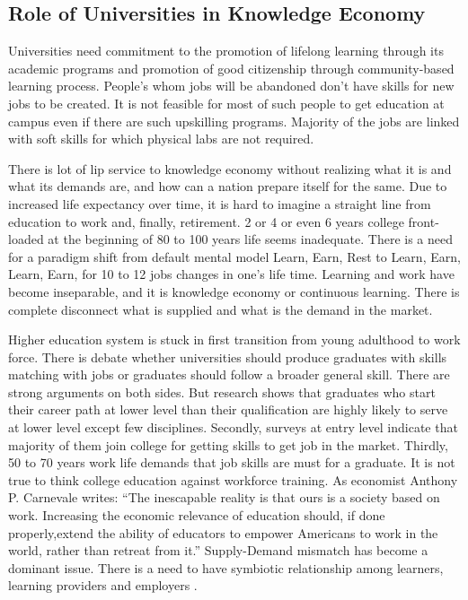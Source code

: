 \documentclass[
]{aft}
\begin{document}
\hypertarget{role-of-universities-in-knowledge-economy}{%
\subsection{Role of Universities in Knowledge
Economy}\label{role-of-universities-in-knowledge-economy}}

Universities need commitment to the promotion of lifelong learning
through its academic programs and promotion of good citizenship through
community-based learning process. People's whom jobs will be abandoned
don't have skills for new jobs to be created. It is not feasible for
most of such people to get education at campus even if there are such
upskilling programs. Majority of the jobs are linked with soft skills
for which physical labs are not required.

There is lot of lip service to knowledge economy without realizing what
it is and what its demands are, and how can a nation prepare itself for
the same. Due to increased life expectancy over time, it is hard to
imagine a straight line from education to work and, finally, retirement.
2 or 4 or even 6 years college front-loaded at the beginning of 80 to
100 years life seems inadequate. There is a need for a paradigm shift
from default mental model Learn, Earn, Rest to Learn, Earn, Learn, Earn,
for 10 to 12 jobs changes in one's life time. Learning and work have
become inseparable, and it is knowledge economy or continuous learning.
There is complete disconnect what is supplied and what is the demand in
the market.

Higher education system is stuck in first transition from young
adulthood to work force. There is debate whether universities should
produce graduates with skills matching with jobs or graduates should
follow a broader general skill. There are strong arguments on both
sides. But research shows that graduates who start their career path at
lower level than their qualification are highly likely to serve at lower
level except few disciplines. Secondly, surveys at entry level indicate
that majority of them join college for getting skills to get job in the
market. Thirdly, 50 to 70 years work life demands that job skills are
must for a graduate. It is not true to think college education against
workforce training. As economist Anthony P. Carnevale writes: ``The
inescapable reality is that ours is a society based on work. Increasing
the economic relevance of education should, if done properly,extend the
ability of educators to empower Americans to work in the world, rather
than retreat from it.'' Supply-Demand mismatch has become a dominant
issue. There is a need to have symbiotic relationship among learners,
learning providers and employers \citet{AmericanAAS2018} .
\end{document}
